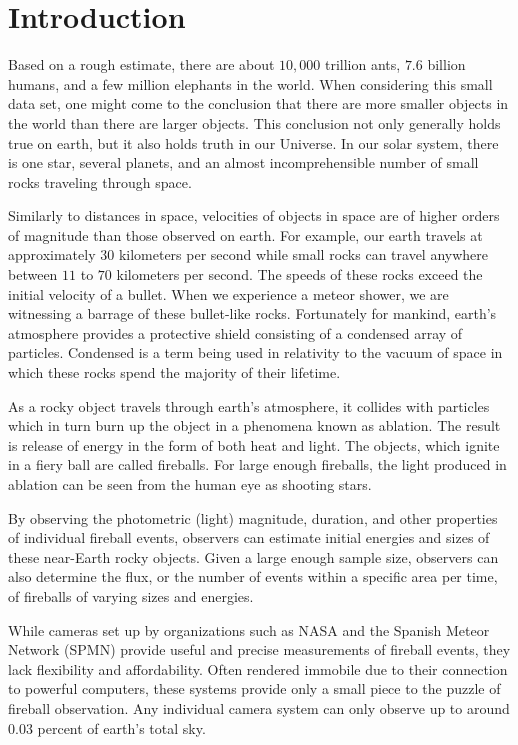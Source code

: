 \chapter{Introduction}

Based on a rough estimate, there are about $10,000$ trillion ants, $7.6$ billion humans, and a few million elephants in the world.
When considering this small data set, one might come to the conclusion that there are more smaller objects in the world than there are larger objects.
This conclusion not only generally holds true on earth, but it also holds truth in our Universe.
In our solar system, there is one star, several planets, and an almost incomprehensible number of small rocks traveling through space. 

Similarly to distances in space, velocities of objects in space are of higher orders of magnitude than those observed on earth.
For example, our earth travels at approximately $30$ kilometers per second while small rocks can travel anywhere between $11$ to $70$ kilometers per second.  
The speeds of these rocks exceed the initial velocity of a bullet.
When we experience a meteor shower, we are witnessing a barrage of these bullet-like rocks.  
Fortunately for mankind, earth’s atmosphere provides a protective shield consisting of a condensed array of particles.  
Condensed is a term being used in relativity to the vacuum of space in which these rocks spend the majority of their lifetime. 

As a rocky object travels through earth’s atmosphere, it collides with particles which in turn burn up the object in a phenomena known as ablation.  
The result is release of energy in the form of both heat and light.  
The objects, which ignite in a fiery ball are called fireballs.  
For large enough fireballs, the light produced in ablation can be seen from the human eye as shooting stars.

By observing the photometric (light) magnitude, duration, and other properties of individual fireball events, observers can estimate initial energies and sizes of these near-Earth rocky objects.  
Given a large enough sample size, observers can also determine the flux, or the number of events within a specific area per time, of fireballs of varying sizes and energies.

While cameras set up by organizations such as NASA and the Spanish Meteor Network (SPMN) provide useful and precise measurements of fireball events, they lack flexibility and affordability.  
Often rendered immobile due to their connection to powerful computers, these systems provide only a small piece to the puzzle of fireball observation.  
Any individual camera system can only observe up to around 0.03 percent of earth’s total sky.  

